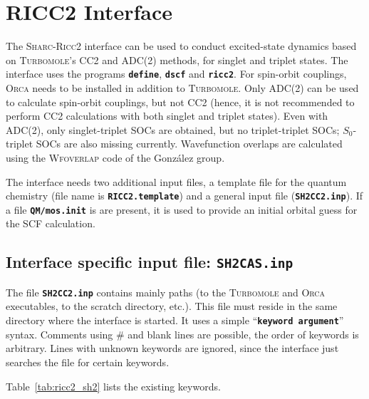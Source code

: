 \documentclass[a4paper,11pt,DIV=15,openany,twoside=false]{scrbook}
\newcommand{\sharc}{\textsc{Sharc}}
\newcommand{\ttt}[1]{\textbf{\texttt{#1}}}
\begin{document}

\section{RICC2 Interface}\label{sec:int:ricc2}

The \sharc-\textsc{Ricc2} interface can be used to conduct excited-state dynamics based on \textsc{Turbomole}'s CC2 and ADC(2) methods, for singlet and triplet states.
The interface uses the programs \ttt{define}, \ttt{dscf} and \ttt{ricc2}.
For spin-orbit couplings, \textsc{Orca} needs to be installed in addition to \textsc{Turbomole}.
Only ADC(2) can be used to calculate spin-orbit couplings, but not CC2 (hence, it is not recommended to perform CC2 calculations with both singlet and triplet states).
Even with ADC(2), only singlet-triplet SOCs are obtained, but no triplet-triplet SOCs; $S_0$-triplet SOCs are also missing currently.
Wavefunction overlaps are calculated using the \textsc{Wfoverlap} code of the Gonz\'alez group.\cite{Plasser2016JCTC}

The interface needs two additional input files, a template file for the quantum chemistry (file name is \ttt{RICC2.template}) and a general input file (\ttt{SH2CC2.inp}). 
If a file \ttt{QM/mos.init} is are present, it is used to provide an initial orbital guess for the SCF calculation.

\subsection{Interface specific input file: \ttt{SH2CAS.inp}}

The file \ttt{SH2CC2.inp} contains mainly paths (to the \textsc{Turbomole} and \textsc{Orca} executables, to the scratch directory, etc.). This file must reside in the same directory where the interface is started. It uses a simple ``\ttt{keyword argument}'' syntax. Comments using \# and blank lines are possible, the order of keywords is arbitrary. Lines with unknown keywords are ignored, since the interface just searches the file for certain keywords.

Table~\ref{tab:ricc2_sh2} lists the existing keywords.
\end{document}

